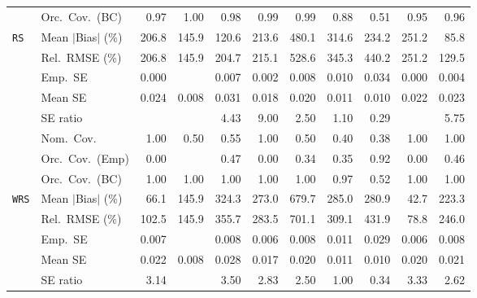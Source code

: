 \begin{landscape}
\begin{longtable}{llrrrrrrrrr}
 & Orc.\ Cov.\ (BC) & \cellcolor{rankthree}0.97 & 1.00 & 0.98 & 0.99 & 0.99 & 0.88 & 0.51 & \cellcolor{rankone}0.95 & \cellcolor{ranktwo}0.96 \\
\addlinespace[2pt]
\quad \texttt{RS} & Mean $|$Bias$|$ (\%) & 206.8 & \cellcolor{rankthree}145.9 & \cellcolor{ranktwo}120.6 & 213.6 & 480.1 & 314.6 & 234.2 & 251.2 & \cellcolor{rankone}85.8 \\
 & Rel.\ RMSE (\%) & 206.8 & \cellcolor{ranktwo}145.9 & \cellcolor{rankthree}204.7 & 215.1 & 528.6 & 345.3 & 440.2 & 251.2 & \cellcolor{rankone}129.5 \\
 & Emp.\ SE & 0.000 &  & 0.007 & 0.002 & 0.008 & 0.010 & 0.034 & 0.000 & 0.004 \\
 & Mean SE & 0.024 & 0.008 & 0.031 & 0.018 & 0.020 & 0.011 & 0.010 & 0.022 & 0.023 \\
 & SE ratio &  &  & 4.43 & 9.00 & \cellcolor{rankthree}2.50 & \cellcolor{rankone}1.10 & \cellcolor{ranktwo}0.29 &  & 5.75 \\
 & Nom.\ Cov. & \cellcolor{rankone}1.00 & \cellcolor{rankthree}0.50 & \cellcolor{ranktwo}0.55 & \cellcolor{rankone}1.00 & \cellcolor{rankthree}0.50 & 0.40 & 0.38 & \cellcolor{rankone}1.00 & \cellcolor{rankone}1.00 \\
 & Orc.\ Cov.\ (Emp) & 0.00 &  & \cellcolor{ranktwo}0.47 & 0.00 & 0.34 & 0.35 & \cellcolor{rankone}0.92 & 0.00 & \cellcolor{rankthree}0.46 \\
 & Orc.\ Cov.\ (BC) & \cellcolor{ranktwo}1.00 & \cellcolor{ranktwo}1.00 & \cellcolor{ranktwo}1.00 & \cellcolor{ranktwo}1.00 & \cellcolor{ranktwo}1.00 & \cellcolor{rankone}0.97 & \cellcolor{rankthree}0.52 & \cellcolor{ranktwo}1.00 & \cellcolor{ranktwo}1.00 \\
\addlinespace[2pt]
\quad \texttt{WRS} & Mean $|$Bias$|$ (\%) & \cellcolor{ranktwo}66.1 & \cellcolor{rankthree}145.9 & 324.3 & 273.0 & 679.7 & 285.0 & 280.9 & \cellcolor{rankone}42.7 & 223.3 \\
 & Rel.\ RMSE (\%) & \cellcolor{ranktwo}102.5 & \cellcolor{rankthree}145.9 & 355.7 & 283.5 & 701.1 & 309.1 & 431.9 & \cellcolor{rankone}78.8 & 246.0 \\
 & Emp.\ SE & 0.007 &  & 0.008 & 0.006 & 0.008 & 0.011 & 0.029 & 0.006 & 0.008 \\
 & Mean SE & 0.022 & 0.008 & 0.028 & 0.017 & 0.020 & 0.011 & 0.010 & 0.020 & 0.021 \\
 & SE ratio & 3.14 &  & 3.50 & 2.83 & \cellcolor{rankthree}2.50 & \cellcolor{rankone}1.00 & \cellcolor{ranktwo}0.34 & 3.33 & 2.62 \\

\end{longtable}
\end{landscape}
